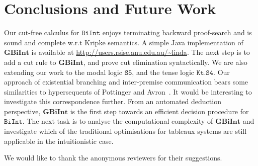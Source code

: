 \documentclass{llncs}
\numberwithin{equation}{section}
\newcommand{\Lg}[1]{\mathtt{#1}}
\newcommand {\BiInt}{
        \Lg{BiInt}
}
\newcommand {\SFive}{
        \Lg{S5}
}
\newcommand {\KtSFour}{
        \Lg{Kt.S4}
}
\newcommand{\GBiInt}{\mathbf{GBiInt}}
\begin{document}
\section{Conclusions and Future Work}\label{sec:conclusion}

Our cut-free calculus for $\BiInt$ enjoys terminating backward
proof-search and is sound and complete w.r.t Kripke semantics.  A
simple Java implementation of $\GBiInt$ is available at
\url{http://users.rsise.anu.edu.au/~linda}.
The next step is to add a cut rule to $\GBiInt$, and prove cut
elimination syntactically. We are also extending our work to the modal logic $\SFive$, and the tense
logic $\KtSFour$. Our approach of existential branching and inter-premise communication bears some similarities to hypersequents of Pottinger and Avron~\cite{avron1996}. It would be interesting to investigate this correspondence further. From an automated deduction perspective, $\GBiInt$ is the first step towards an efficient decision procedure for $\BiInt$. The next task is to analyse the computational complexity of $\GBiInt$ and investigate which of the traditional optimisations for tableaux systems are still applicable in the intuitionistic case.

We would like to thank the anonymous reviewers for their suggestions.
\end{document}
